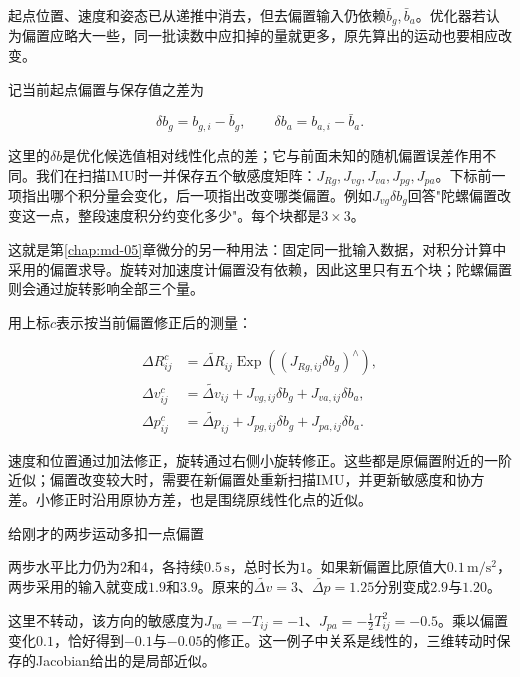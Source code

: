 起点位置、速度和姿态已从递推中消去，但去偏置输入仍依赖$\bar b_g,\bar b_a$。优化器若认为偏置应略大一些，同一批读数中应扣掉的量就更多，原先算出的运动也要相应改变。

记当前起点偏置与保存值之差为

\begin{equation*}
\delta b_g=b_{g,i}-\bar b_g,\qquad
 \delta b_a=b_{a,i}-\bar b_a.
\end{equation*}

这里的$\delta b$是优化候选值相对线性化点的差；它与前面未知的随机偏置误差作用不同。我们在扫描IMU时一并保存五个敏感度矩阵：$J_{R g},J_{v g},J_{v a},J_{p g},J_{p a}$。下标前一项指出哪个积分量会变化，后一项指出改变哪类偏置。例如$J_{v g}\delta b_g$回答"陀螺偏置改变这一点，整段速度积分约变化多少"。每个块都是$3\times3$。

这就是第\ref{chap:md-05}章微分的另一种用法：固定同一批输入数据，对积分计算中采用的偏置求导。旋转对加速度计偏置没有依赖，因此这里只有五个块；陀螺偏置则会通过旋转影响全部三个量。

用上标$c$表示按当前偏置修正后的测量：

\begin{equation}\label{eq-intuition-bias-correction}
\begin{aligned}
 \Delta R_{ij}^{c}
 &=\widetilde{\Delta R}_{ij}\mathop{\mathrm{Exp}}((J_{R g,ij}\delta b_g)^\wedge),\\
 \Delta v_{ij}^{c}
 &=\widetilde{\Delta v}_{ij}+J_{v g,ij}\delta b_g+J_{v a,ij}\delta b_a,\\
 \Delta p_{ij}^{c}
 &=\widetilde{\Delta p}_{ij}+J_{p g,ij}\delta b_g+J_{p a,ij}\delta b_a.
\end{aligned}
\end{equation}

速度和位置通过加法修正，旋转通过右侧小旋转修正。这些都是原偏置附近的一阶近似；偏置改变较大时，需要在新偏置处重新扫描IMU，并更新敏感度和协方差。小修正时沿用原协方差，也是围绕原线性化点的近似。

\begin{bookexample}{给刚才的两步运动多扣一点偏置}

两步水平比力仍为$2$和$4$，各持续$0.5\,\mathrm s$，总时长为$1$。如果新偏置比原值大$0.1\,\mathrm{m/s^2}$，两步采用的输入就变成$1.9$和$3.9$。原来的$\widetilde{\Delta v}=3$、$\widetilde{\Delta p}=1.25$分别变成$2.9$与$1.20$。

这里不转动，该方向的敏感度为$J_{v a}=-T_{ij}=-1$、$J_{p a}=-\tfrac12T_{ij}^2=-0.5$。乘以偏置变化$0.1$，恰好得到$-0.1$与$-0.05$的修正。这一例子中关系是线性的，三维转动时保存的Jacobian给出的是局部近似。

\end{bookexample}


